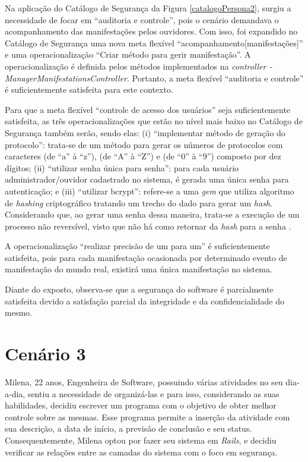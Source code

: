 Na aplicação do Catálogo de Segurança da Figura \ref{catalogoPersona2}, surgiu a necessidade de focar em  “auditoria e controle”, pois o cenário demandava  o acompanhamento das manifestações pelos ouvidores. Com isso, foi expandido no Catálogo de Segurança uma nova meta flexível “acompanhamento[manifestações]” e uma operacionalização “Criar método para gerir manifestação”. A operacionalização é definida pelos métodos implementados na \textit{controller - ManagerManifestationsController}. Portanto, a meta flexível “auditoria e controle” é suficientemente satisfeita para este contexto.

Para que a meta flexível “controle de acesso dos usuários” seja suficientemente satisfeita, as três operacionalizações que estão no nível mais baixo no Catálogo de Segurança também serão, sendo elas: (i) “implementar método de geração do protocolo”: trata-se de um método para gerar os números de protocolos com caracteres (de “a” à “z”), (de “A” à “Z”) e (de “0” à “9”) composto por dez dígitos; (ii) “utilizar senha única para senha”: para cada usuário administrador/ouvidor cadastrado no sistema, é gerada uma única senha para autenticação; e (iii) “utilizar bcrypt”: refere-se a uma \textit{gem} que utiliza algoritmo de \textit{hashing} criptográfico tratando um trecho do dado para gerar um \textit{hash}. Considerando que, ao gerar uma senha dessa maneira, trata-se a execução de um processo não reversível, visto que não há como retornar da \textit{hash} para a senha \cite{brcypt}.

A operacionalização “realizar precisão de um para um” é suficientemente satisfeita, pois para cada manifestação ocasionada por determinado evento de manifestação do mundo real, existirá uma única manifestação no sistema.

Diante do exposto, observa-se que a segurança do software é parcialmente satisfeita devido a satisfação parcial da integridade e da confidencialidade do mesmo.

\section{Cenário 3}
\label{subsec:persona3}

Milena, 22 anos, Engenheira de Software, possuindo várias atividades no seu dia-a-dia, sentiu a necessidade de organizá-las e para isso, considerando as suas habilidades, decidiu escrever um programa com o objetivo de obter melhor controle sobre as mesmas. Esse programa permite a inserção da atividade com sua descrição, a data de início, a previsão de conclusão e seu status. Consequentemente, Milena optou por fazer seu sistema em \textit{Rails}, e decidiu verificar as relações entre as camadas do sistema com o foco em segurança.

